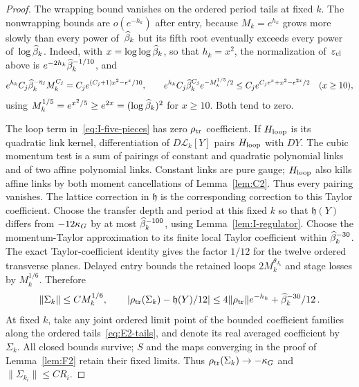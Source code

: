 \begin{proof}
The wrapping bound vanishes on the ordered period tails at fixed $k$. The nonwrapping bounds are $o(e^{-h_k})$ after entry, because $M_k=e^{h_k}$ grows more slowly than every power of~$\widehat{\beta}_k$ but its fifth root eventually exceeds every power of~$\log\widehat{\beta}_k$. Indeed, with $x=\log\log\widehat{\beta}_k$, so that $h_k=x^2$, the normalization of~$\varepsilon_{\rm cl}$ above is $e^{-2h_k}\widehat{\beta}_k^{-1/10}$, and
\begin{equation*}
e^{h_k}C_j\widehat{\beta}_k^{-\eta_j}M_k^{C_j}=C_je^{(C_j+1)x^2-e^x/10},\qquad
e^{h_k}C_j\widehat{\beta}_k^{C_j}e^{-M_k^{1/5}/2}\le C_je^{C_je^x+x^2-e^{2x}/2}\quad(x\ge10),
\end{equation*}
using $M_k^{1/5}=e^{x^2/5}\ge e^{2x}=(\log\widehat{\beta}_k)^2$ for $x\ge10$. Both tend to zero.

The loop term in~\eqref{eq:I-five-pieces} has zero $\rho_{\rm tr}$ coefficient. If $H_{\rm loop}$ is its quadratic link kernel, differentiation of $D\mathcal L_k[Y]$ pairs $H_{\rm loop}$ with $DY$. The cubic momentum test is a sum of pairings of constant and quadratic polynomial links and of two affine polynomial links. Constant links are pure gauge; $H_{\rm loop}$ also kills affine links by both moment cancellations of Lemma~\ref{lem:C2}. Thus every pairing vanishes. The lattice correction in $\mathfrak h$ is the corresponding correction to this Taylor coefficient.
Choose the transfer depth and period at this fixed $k$ so that $\mathfrak h(Y)$ differs from $-12\kappa_G$ by at most $\widehat{\beta}_k^{-100}$, using Lemma~\ref{lem:I-regulator}. Choose the momentum-Taylor approximation to its finite local Taylor coefficient within $\widehat{\beta}_k^{-30}$. The exact Taylor-coefficient identity gives the factor $1/12$ for the twelve ordered transverse planes. Delayed entry bounds the retained loops $2M_k^{\theta_{J_k}}$ and stage losses by $M_k^{1/6}$. Therefore
\begin{equation*}
\|\Sigma_k\|\le CM_k^{1/6},\qquad
|\rho_{\rm tr}(\Sigma_k)-\mathfrak h(Y)/12|\le4\|\rho_{\rm tr}\|e^{-h_k}+\widehat{\beta}_k^{-30}/12\,.
\end{equation*}
At fixed $k$, take any joint ordered limit point of the bounded coefficient families along the ordered tails~\eqref{eq:E2-tails}, and denote its real averaged coefficient by $\Sigma_k$. All closed bounds survive; $S$ and the maps converging in the proof of Lemma~\ref{lem:F2} retain their fixed limits. Thus $\rho_{\rm tr}(\Sigma_k)\to-\kappa_G$ and $\|\Sigma_{k_i}\|\le CR_i$.


\end{proof}
